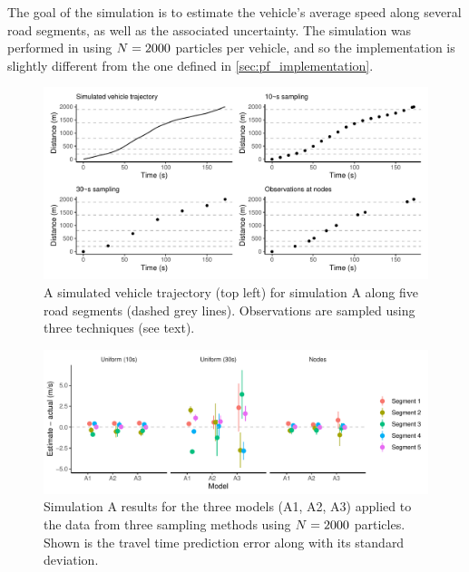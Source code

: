 The goal of the simulation is to estimate the vehicle's average speed along several road segments, as well as the associated uncertainty. The simulation was performed in \Rstats{} \citep{rcore} using $N = 2000$ particles per vehicle, and so the implementation is slightly different from the \Cpp{} one defined in \cref{sec:pf_implementation}.

\begin{knitrout}\small
{}\color{fgcolor}\begin{figure}
\includegraphics[width=\linewidth]{figure/sim1_graph-1} \caption[Vehicle trajectory with sampled observations for simulation A]{A simulated vehicle trajectory (top left) for simulation A along five road segments (dashed grey lines). Observations are sampled using three techniques (see text).}\label{fig:sim1_graph}
\end{figure}


\end{knitrout}

\begin{knitrout}\small
{}\color{fgcolor}\begin{figure}
\includegraphics[width=\linewidth]{figure/sim1_pf-1} \caption[Results for simulation A]{Simulation A results for the three models (A1, A2, A3) applied to the data from three sampling methods using $N=2000$ particles. Shown is the travel time prediction error along with its standard deviation.}\label{fig:sim1_pf}
\end{figure}


\end{knitrout}


